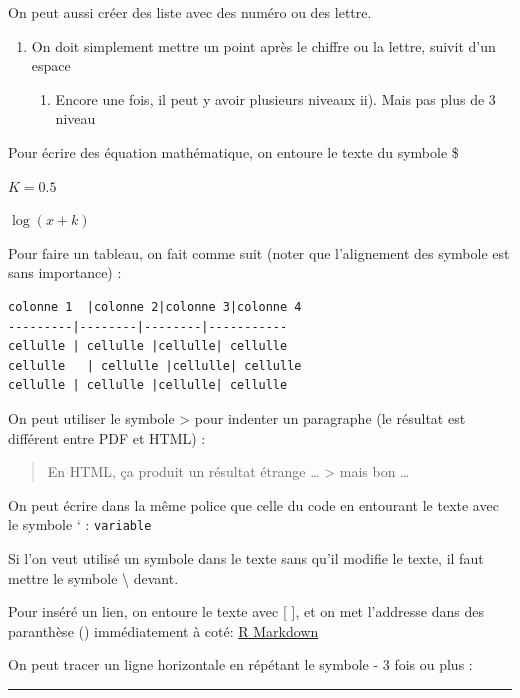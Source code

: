 \documentclass[
  12pt,
]{book}
\providecommand{\tightlist}{%
  \setlength{\itemsep}{0pt}\setlength{\parskip}{0pt}}
\begin{document}
On peut aussi créer des liste avec des numéro ou des lettre.

\begin{enumerate}
\def\labelenumi{\arabic{enumi}.}
\tightlist
\item
  On doit simplement mettre un point après le chiffre ou la lettre, suivit d'un espace

  \begin{enumerate}
  \def\labelenumii{\alph{enumii}.}
  \tightlist
  \item
    Encore une fois, il peut y avoir plusieurs niveaux
    ii). Mais pas plus de 3 niveau
  \end{enumerate}
\end{enumerate}

Pour écrire des équation mathématique, on entoure le texte du symbole \$

\(K = 0.5\)

\(\log(x + k)\)

Pour faire un tableau, on fait comme suit (noter que l'alignement des symbole est sans importance) :

\begin{verbatim}
colonne 1  |colonne 2|colonne 3|colonne 4
---------|--------|--------|-----------
cellulle | cellulle |cellulle| cellulle
cellulle   | cellulle |cellulle| cellulle
cellulle | cellulle |cellulle| cellulle
\end{verbatim}

On peut utiliser le symbole \textgreater{} pour indenter un paragraphe (le résultat est différent entre PDF et HTML) :

\begin{quote}
En HTML, ça produit un résultat étrange \ldots{}
\textgreater{} mais bon \ldots{}
\end{quote}

On peut écrire dans la même police que celle du code en entourant le texte avec le symbole ` :
\texttt{variable}

Si l'on veut utilisé un symbole dans le texte sans qu'il modifie le texte, il faut mettre le symbole \textbackslash{} devant.

Pour inséré un lien, on entoure le texte avec {[} {]}, et on met l'addresse dans des paranthèse () immédiatement à coté:
\href{http://rmarkdown.rstudio.com}{R Markdown}

On peut tracer un ligne horizontale en répétant le symbole - 3 fois ou plus :

\begin{center}\rule{0.5\linewidth}{0.5pt}\end{center}
\end{document}

